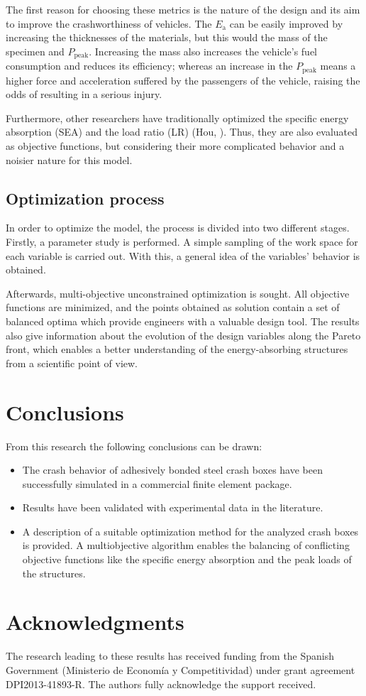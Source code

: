 \documentclass[cmfonts]{witpress}
\begin{document}
The first reason for choosing these metrics is the nature of the design and its aim to improve the crashworthiness of vehicles. The $E_\text{a}$ can be easily improved by increasing the thicknesses of the materials, but this would the mass of the specimen and $P_\text{peak}$. Increasing the mass also  increases the vehicle's fuel consumption and reduces its efficiency; whereas an increase in the $P_\text{peak}$ means a higher force and acceleration suffered by the passengers of the vehicle, raising the odds of resulting in a serious injury.

Furthermore, other researchers have traditionally optimized the specific energy absorption (SEA) and the load ratio (LR) (Hou, \cite{Hou2007555}). Thus, they are also evaluated as objective functions, but considering their more complicated behavior and a noisier nature for this model. 

\subsection{Optimization process}

In order to optimize the model, the process is divided into two different stages. Firstly, a parameter study is performed. A simple sampling of the work space for each variable is carried out. With this, a general idea of the variables' behavior is obtained.


Afterwards, multi-objective unconstrained optimization is sought. All objective functions are minimized, and the points obtained as solution contain a set of balanced optima which provide engineers with a valuable design tool. The results also give information about the evolution of the design variables along the Pareto front, which enables a better understanding of the energy-absorbing structures from a scientific point of view.

\section{Conclusions}
From this research the following conclusions can be drawn:
\begin{itemize}
	\item The crash behavior of adhesively bonded steel crash boxes have been successfully simulated in a commercial finite element package.
	\item Results have been validated with experimental data in the literature.
	\item A description of a suitable optimization method for the analyzed crash boxes is provided. A multiobjective algorithm enables the balancing of conflicting objective functions like the specific energy absorption and the peak loads of the structures.
\end{itemize}

\section{Acknowledgments}
The research leading to these results has received funding from the Spanish Government (Ministerio de Economía y Competitividad) under grant agreement DPI2013-41893-R. The authors fully acknowledge the support received.


\end{document}
